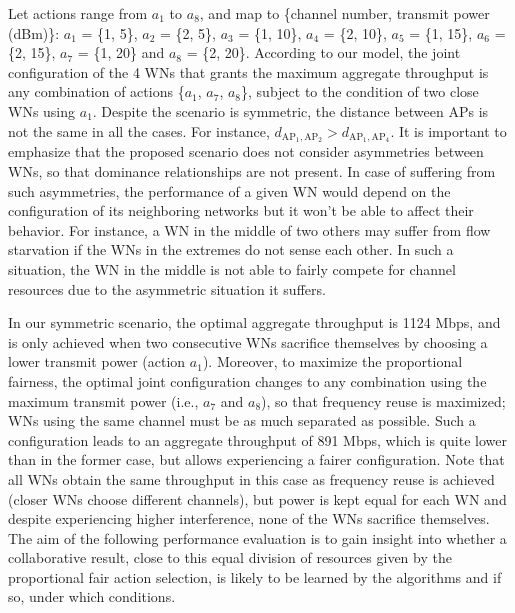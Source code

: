 \documentclass[preprint,12pt]{elsarticle}
\begin{document}
Let actions range from $a_1$ to $a_8$, and map to \{channel number, transmit power (dBm)\}: $a_1$ = \{1, 5\}, $a_2$ = \{2, 5\}, $a_3$ = \{1, 10\}, $a_4$ = \{2, 10\}, $a_5$ = \{1, 15\}, $a_6$ = \{2, 15\}, $a_7$ = \{1, 20\} and $a_8$ = \{2, 20\}. According to our model, the joint configuration of the 4 WNs that grants the maximum aggregate throughput is any combination of actions \{$a_1$, $a_7$, $a_8$\}, subject to the condition of two close WNs using $a_1$. Despite the scenario is symmetric, the distance between APs is not the same in all the cases. For instance, $d_{\text{AP}_1,\text{AP}_2} > d_{\text{AP}_1,\text{AP}_4}$. It is important to emphasize that the proposed scenario does not consider asymmetries between WNs, so that dominance relationships are not present. In case of suffering from such asymmetries, the performance of a given WN would depend on the configuration of its neighboring networks but it won't be able to affect their behavior. For instance, a WN in the middle of two others may suffer from flow starvation if the WNs in the extremes do not sense each other. In such a situation, the WN in the middle is not able to fairly compete for channel resources due to the asymmetric situation it suffers.
	
In our symmetric scenario, the optimal aggregate throughput is 1124 Mbps, and is only achieved when two consecutive WNs sacrifice themselves by choosing a lower transmit power (action $a_1$). Moreover, to maximize the proportional fairness, the optimal joint configuration changes to any combination using the maximum transmit power (i.e., $a_7$ and $a_8$), so that frequency reuse is maximized; WNs using the same channel must be as much separated as possible. Such a configuration leads to an aggregate throughput of 891 Mbps, which is quite lower than in the former case, but allows experiencing a fairer configuration. Note that all WNs obtain the same throughput in this case as frequency reuse is achieved (closer WNs choose different channels), but power is kept equal for each WN and despite experiencing higher interference, none of the WNs sacrifice themselves. The aim of the following performance evaluation is to gain insight into whether a collaborative result, close to this equal division of resources given by the proportional fair action selection, is likely to be learned by the algorithms and if so, under which conditions.

\end{document}
